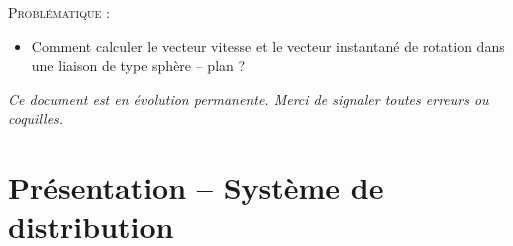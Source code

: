 \documentclass[10pt,oneside]{article}
\begin{document}
\begin{prob}
\textsc{Problématique :}
\begin{itemize}
\item Comment calculer le vecteur vitesse et le vecteur instantané de rotation dans une liaison de type sphère -- plan ?
\end{itemize}
\end{prob}


\setlength{\parskip}{0ex plus 0.2ex minus 0ex}
 \renewcommand{\contentsname}{}
 \renewcommand{\baselinestretch}{1}

\tableofcontents

 \renewcommand{\baselinestretch}{1.2}
\setlength{\parskip}{2ex plus 0.5ex minus 0.2ex}

\textit{Ce document est en évolution permanente. Merci de signaler toutes
erreurs ou coquilles.}


\section{Présentation -- Système de distribution}
\end{document}
